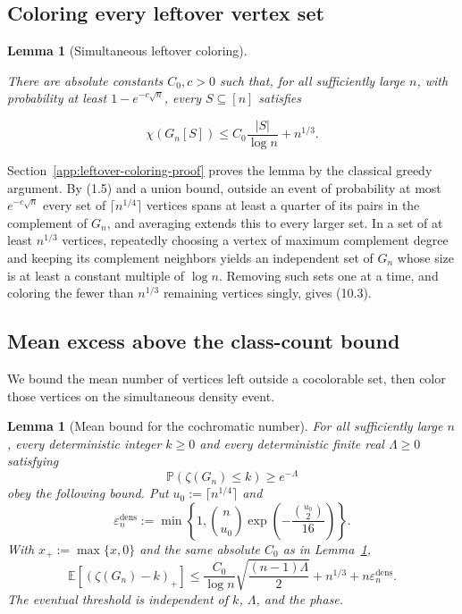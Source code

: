 \documentclass[a4paper,10pt,reqno]{amsart}
\numberwithin{equation}{section}
\newcommand{\Prob}[1]{\mathbb{P}\!\left(#1\right)}
\newcommand{\Exp}[1]{\mathbb{E}\!\left[#1\right]}
\theoremstyle{plain}
\newtheorem{lemma}[theorem]{Lemma}
\theoremstyle{remark}
\begin{document}
\subsection*{Coloring every leftover vertex set}

\begin{lemma}[Simultaneous leftover coloring]
\label{lemma-10.1-simultaneous-leftover-coloring}

There are absolute constants \(C_0,c>0\) such that, for all sufficiently
large \(n\), with probability at least \(1-e^{-c\sqrt n}\), every
\(S\subseteq[n]\) satisfies

\[
 \chi(G_n[S])\le C_0\frac{|S|}{{\log n}}+n^{1/3}.               \tag{10.3}
\]

\end{lemma}

Section~\ref{app:leftover-coloring-proof} proves the lemma by the classical
greedy argument. By (1.5) and a union bound, outside an event of probability
at most $e^{-c\sqrt n}$ every set of $\lceil n^{1/4}\rceil$ vertices spans at
least a quarter of its pairs in the complement of $G_n$, and averaging
extends this to every larger set. In a set of at least $n^{1/3}$ vertices,
repeatedly choosing a vertex of maximum complement degree and keeping its
complement neighbors yields an independent set of $G_n$ whose size is at
least a constant multiple of $\log n$. Removing such sets one at a time, and
coloring the fewer than $n^{1/3}$ remaining vertices singly, gives (10.3).

\subsection*{Mean excess above the class-count bound}

We bound the mean number of vertices left outside a cocolorable set,
then color those vertices on the simultaneous density event.

\begin{lemma}[Mean bound for the cochromatic number]
\label{lem:mean-seed-amplification}
For all sufficiently large $n$, every deterministic integer $k\ge0$ and
every deterministic finite real $\Lambda\ge0$ satisfying
\[
 \Prob{\zeta(G_n)\le k}\ge e^{-\Lambda}
\]
obey the following bound. Put $u_0:=\lceil n^{1/4}\rceil$ and
\[
 \varepsilon_n^{\mathrm{dens}}
 :=\min\!\left\{1,\binom n{u_0}
                   \exp\!\left(-\frac{\binom{u_0}{2}}{16}\right)\right\}.
\]
With $x_+:=\max\{x,0\}$ and the same absolute $C_0$ as in
Lemma~\ref{lemma-10.1-simultaneous-leftover-coloring},
\[
 \Exp{(\zeta(G_n)-k)_+}
 \le\frac{C_0}{\log n}\sqrt{\frac{(n-1)\Lambda}{2}}
      +n^{1/3}+n\varepsilon_n^{\mathrm{dens}}.
\]
The eventual threshold is independent of $k$, $\Lambda$, and the phase.
\end{lemma}
\end{document}
